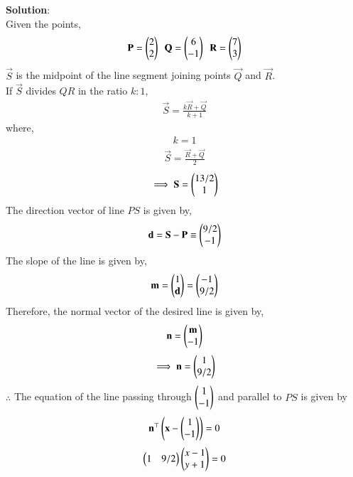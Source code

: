 \documentclass[journal]{IEEEtran}
\begin{document}
\textbf{Solution}:\\
Given the points,\\
\begin{align}
\mathbf{P}=\begin{pmatrix}2\\2\end{pmatrix}\ \ \mathbf{Q}=\begin{pmatrix}6\\-1\end{pmatrix}\ \ \mathbf{R}=\begin{pmatrix}7\\3\end{pmatrix}
\end{align}
$\vec{S}$ is the midpoint of the line segment joining points $\vec{Q}$ and $\vec{R}$.\\
If $\vec{S}$ divides $QR$ in the ratio $k : 1$,
		\begin{align}
			\vec{S}= \frac{k\vec{R}+\vec{Q}}{k+1}
		\end{align}
where,
\begin{align}
    k=1
\end{align}
\begin{align}
    \vec{S}= \frac{\vec{R}+\vec{Q}}{2}
\end{align}
\begin{align}
    \implies\mathbf{S}= \begin{pmatrix}13/2\\1\end{pmatrix}
\end{align}
The direction vector of line $PS$ is given by,
\begin{align}
	\mathbf{d}=\mathbf{S}-\mathbf{P} \equiv \begin{pmatrix}9/2\\-1\end{pmatrix}
\end{align}
The slope of the line is given by,
\begin{align}
	\mathbf{m}=\begin{pmatrix}1\\\mathbf{d}\end{pmatrix}=\begin{pmatrix}-1\\9/2\end{pmatrix}
\end{align}
Therefore, the normal vector of the desired line is given by,
\begin{align}
	\mathbf{n}=\begin{pmatrix}\mathbf{m}\\-1\end{pmatrix}
\end{align}
\begin{align}
    \implies\mathbf{n}=\begin{pmatrix}1\\9/2\end{pmatrix}
\end{align}
$\therefore$ The equation of the line passing through $\begin{pmatrix}1\\-1\end{pmatrix}$ and parallel to $PS$ is given by
\begin{align}
    \mathbf{n}^{\top}\left(\mathbf{x}-\begin{pmatrix}1\\-1\end{pmatrix}\right)=0
\end{align}
\begin{align}
    \begin{pmatrix}1 & 9/2\end{pmatrix}\begin{pmatrix}x-1\\y+1\end{pmatrix}=0
\end{align}
\end{document}
